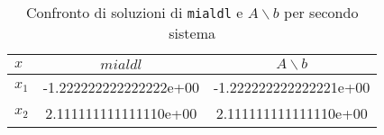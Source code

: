 \FloatBarrier
\begin{table}[ht]
   \centering
   \renewcommand\arraystretch{2}
   \begin{tabular}{| l | c c |}
      \hline
      $x$     & $mialdl$               & $A \backslash b$       \\
      \hline
      $x_{1}$ & -1.222222222222222e+00 & -1.222222222222221e+00 \\
      $x_{2}$ & 2.111111111111110e+00  & 2.111111111111110e+00  \\
      \hline
   \end{tabular}
   \caption{Confronto di soluzioni di \lstinline{mialdl} e $A \backslash b$ per secondo sistema}
   \label{tab:9_2}
\end{table}
\FloatBarrier
